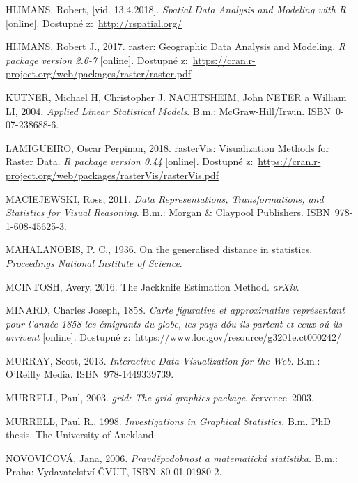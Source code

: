\documentclass[12pt,]{article}
\begin{document}
\hypertarget{ref-spatial2}{}
HIJMANS, Robert, {[}vid. 13.4.2018{]}. \emph{Spatial Data Analysis and
Modeling with R} {[}online{]}. Dostupné z:~\url{http://rspatial.org/}

\hypertarget{ref-raster}{}
HIJMANS, Robert J., 2017. raster: Geographic Data Analysis and Modeling.
\emph{R package version 2.6-7} {[}online{]}. Dostupné
z:~\url{https://cran.r-project.org/web/packages/raster/raster.pdf}

\hypertarget{ref-kutner_transform}{}
KUTNER, Michael H, Christopher J. NACHTSHEIM, John NETER a William LI,
2004. \emph{Applied Linear Statistical Models}. B.m.: McGraw-Hill/Irwin.
ISBN~0-07-238688-6.

\hypertarget{ref-rasterVis}{}
LAMIGUEIRO, Oscar Perpinan, 2018. rasterVis: Visualization Methods for
Raster Data. \emph{R package version 0.44} {[}online{]}. Dostupné
z:~\url{https://cran.r-project.org/web/packages/rasterVis/rasterVis.pdf}

\hypertarget{ref-datarep2011}{}
MACIEJEWSKI, Ross, 2011. \emph{Data Representations, Transformations,
and Statistics for Visual Reasoning}. B.m.: Morgan \& Claypool
Publishers. ISBN~978-1-608-45625-3.

\hypertarget{ref-mbdist}{}
MAHALANOBIS, P. C., 1936. On the generalised distance in statistics.
\emph{Proceedings National Institute of Science}.

\hypertarget{ref-mcintosh2016}{}
MCINTOSH, Avery, 2016. The Jackknife Estimation Method. \emph{arXiv}.

\hypertarget{ref-minard1858}{}
MINARD, Charles Joseph, 1858. \emph{Carte figurative et approximative
représentant pour l'année 1858 les émigrants du globe, les pays dóu ils
partent et ceux oú ils arrivent} {[}online{]}. Dostupné
z:~\url{https://www.loc.gov/resource/g3201e.ct000242/}

\hypertarget{ref-murray}{}
MURRAY, Scott, 2013. \emph{Interactive Data Visualization for the Web}.
B.m.: O'Reilly Media. ISBN~978-1449339739.

\hypertarget{ref-murrell2003}{}
MURRELL, Paul, 2003. \emph{grid: The grid graphics package}.
červenec~2003.

\hypertarget{ref-murrell1998}{}
MURRELL, Paul R., 1998. \emph{Investigations in Graphical Statistics}.
B.m. PhD thesis. The University of Auckland.

\hypertarget{ref-novovic2006}{}
NOVOVIČOVÁ, Jana, 2006. \emph{Pravděpodobnost a matematická statistika}.
B.m.: Praha: Vydavatelství ČVUT, ISBN~80-01-01980-2.
\end{document}

